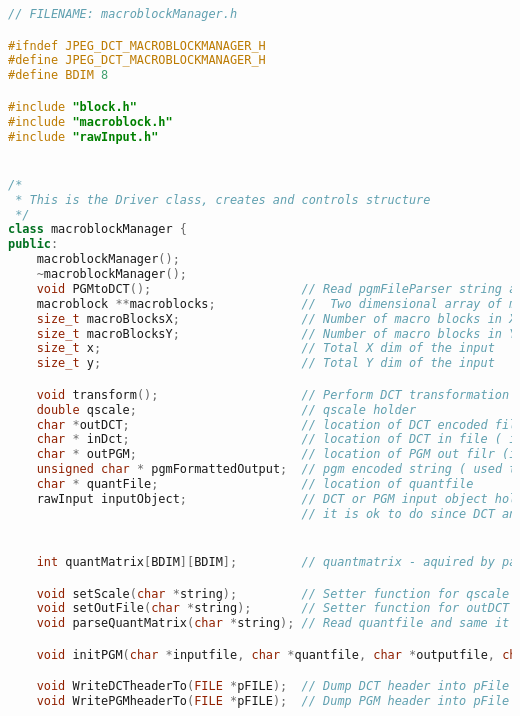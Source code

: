 \documentclass{report}
\begin{document}
\begin{lstlisting}[language=C++]
// FILENAME: macroblockManager.h

#ifndef JPEG_DCT_MACROBLOCKMANAGER_H
#define JPEG_DCT_MACROBLOCKMANAGER_H
#define BDIM 8

#include "block.h"
#include "macroblock.h"
#include "rawInput.h"


/*
 * This is the Driver class, creates and controls structure
 */
class macroblockManager {
public:
    macroblockManager();
    ~macroblockManager();
    void PGMtoDCT();                     // Read pgmFileParser string and dumpToDCT it to output file
    macroblock **macroblocks;            //  Two dimensional array of macroblocks (the only thing here that needs to be deleted
    size_t macroBlocksX;                 // Number of macro blocks in X dim
    size_t macroBlocksY;                 // Number of macro blocks in Y dim
    size_t x;                            // Total X dim of the input
    size_t y;                            // Total Y dim of the input

    void transform();                    // Perform DCT transformation
    double qscale;                       // qscale holder
    char *outDCT;                        // location of DCT encoded file (in pgm -> dct transformation)
    char * inDct;                        // location of DCT in file ( in dct -> pgm transformation)
    char * outPGM;                       // location of PGM out filr (in dct -> pgm transformation)
    unsigned char * pgmFormattedOutput;  // pgm encoded string ( used to dump pgm in dct -> pgm transofrmation)
    char * quantFile;                    // location of quantfile
    rawInput inputObject;                // DCT or PGM input object holder - depends on how it is invoked
                                         // it is ok to do since DCT and PGM header are close enough.


    int quantMatrix[BDIM][BDIM];         // quantmatrix - aquired by parsing quantfile

    void setScale(char *string);         // Setter function for qscale value
    void setOutFile(char *string);       // Setter function for outDCT
    void parseQuantMatrix(char *string); // Read quantfile and same it into quantMatrix

    void initPGM(char *inputfile, char *quantfile, char *outputfile, char *qscale); // Initialize all data required for PGM->DCT transformation

    void WriteDCTheaderTo(FILE *pFILE);  // Dump DCT header into pFile
    void WritePGMheaderTo(FILE *pFILE);  // Dump PGM header into pFile


\end{lstlisting}
\end{document}
